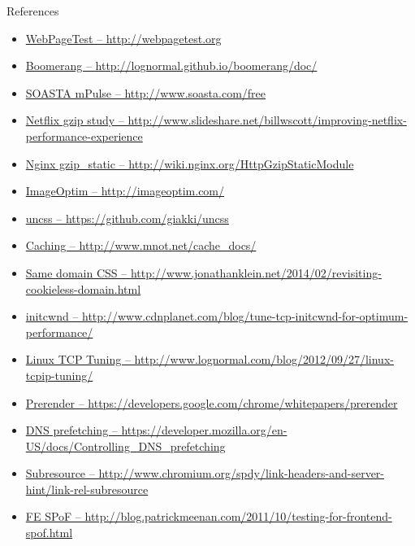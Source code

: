 \documentclass{beamer}
\begin{document}
\begin{frame}{References}
\begin{itemize}
  \item \tiny \href{http://webpagetest.org}{WebPageTest -- http://webpagetest.org}
  \item \tiny \href{http://lognormal.github.io/boomerang/doc/}{Boomerang -- http://lognormal.github.io/boomerang/doc/}
  \item \tiny \href{http://www.soasta.com/free}{SOASTA mPulse -- http://www.soasta.com/free}
  \item \tiny \href{http://www.slideshare.net/billwscott/improving-netflix-performance-experience}{Netflix gzip study -- http://www.slideshare.net/billwscott/improving-netflix-performance-experience}
  \item \tiny \href{http://wiki.nginx.org/HttpGzipStaticModule}{Nginx gzip\_static -- http://wiki.nginx.org/HttpGzipStaticModule}
  \item \tiny \href{http://imageoptim.com/}{ImageOptim -- http://imageoptim.com/}
  \item \tiny \href{https://github.com/giakki/uncss}{uncss -- https://github.com/giakki/uncss}
  \item \tiny \href{http://www.mnot.net/cache_docs/}{Caching -- http://www.mnot.net/cache\_docs/}
  \item \tiny \href{http://www.jonathanklein.net/2014/02/revisiting-cookieless-domain.html}{Same domain CSS -- http://www.jonathanklein.net/2014/02/revisiting-cookieless-domain.html}
  \item \tiny \href{http://www.cdnplanet.com/blog/tune-tcp-initcwnd-for-optimum-performance/}{initcwnd -- http://www.cdnplanet.com/blog/tune-tcp-initcwnd-for-optimum-performance/}
  \item \tiny \href{http://www.lognormal.com/blog/2012/09/27/linux-tcpip-tuning/}{Linux TCP Tuning -- http://www.lognormal.com/blog/2012/09/27/linux-tcpip-tuning/}
  \item \tiny \href{https://developers.google.com/chrome/whitepapers/prerender}{Prerender -- https://developers.google.com/chrome/whitepapers/prerender}
  \item \tiny \href{https://developer.mozilla.org/en-US/docs/Controlling_DNS_prefetching}{DNS prefetching -- https://developer.mozilla.org/en-US/docs/Controlling\_DNS\_prefetching}
  \item \tiny \href{http://www.chromium.org/spdy/link-headers-and-server-hint/link-rel-subresource}{Subresource -- http://www.chromium.org/spdy/link-headers-and-server-hint/link-rel-subresource}
  \item \tiny \href{http://blog.patrickmeenan.com/2011/10/testing-for-frontend-spof.html}{FE SPoF -- http://blog.patrickmeenan.com/2011/10/testing-for-frontend-spof.html}
\end{itemize}
\end{frame}
\end{document}
